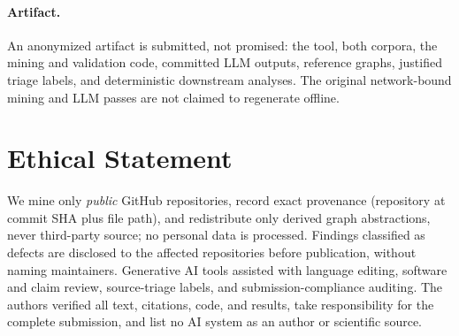 \paragraph{Artifact.}
An anonymized artifact is submitted, not promised: the tool, both corpora, the
mining and validation code, committed LLM outputs, reference graphs, justified
triage labels, and deterministic downstream analyses. The original
network-bound mining and LLM passes are not claimed to regenerate offline.

\section*{Ethical Statement}
We mine only \emph{public} GitHub repositories, record exact provenance
(repository at commit SHA plus file path), and redistribute only derived graph
abstractions, never third-party source; no personal data is processed. Findings
classified as defects are disclosed to the affected repositories before
publication, without naming maintainers. Generative AI tools assisted with
language editing, software and claim review, source-triage labels, and
submission-compliance auditing. The authors verified all text, citations, code,
and results, take responsibility for the complete submission, and list no AI
system as an author or scientific source.
